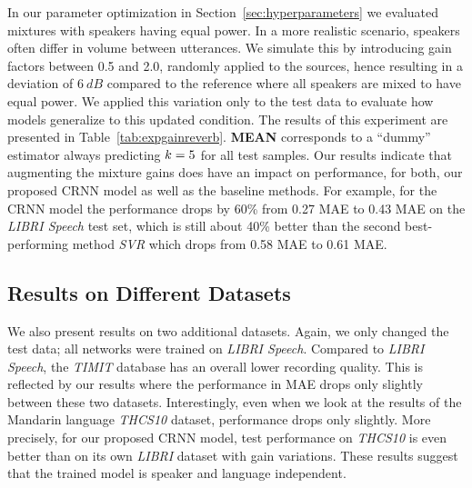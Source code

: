 In our parameter optimization in Section~\ref{sec:hyperparameters} we evaluated  mixtures with speakers having equal power.
In a more realistic scenario, speakers often differ in volume between utterances.
We simulate this by introducing gain factors between 0.5 and 2.0, randomly applied to the sources, hence resulting in a deviation of $6~dB$ compared to the reference where all speakers are mixed to have equal power.
We applied this variation only to the test data to evaluate how models generalize to this updated condition.
The results of this experiment are presented in Table~\ref{tab:expgainreverb}.
\textbf{MEAN} corresponds to a ``dummy'' estimator always predicting \(k = 5\) for all test samples.
Our results indicate that augmenting the mixture gains does have an impact on performance, for both, our proposed CRNN model as well as the baseline methods.
For example, for the CRNN model the performance drops by 60\% from 0.27 MAE to 0.43 MAE on the \emph{LIBRI Speech} test set, which is still about 40\% better than the second best-performing method \emph{SVR} which drops from 0.58 MAE to 0.61 MAE.\@

\subsection{Results on Different Datasets}%
\label{ssec:r_datasets}
We also present results on two additional datasets.
Again, we only changed the test data; all networks were trained on \emph{LIBRI Speech}.
Compared to \emph{LIBRI Speech}, the \emph{TIMIT} database has an overall lower recording quality.
This is reflected by our results where the performance in MAE drops only slightly between these two datasets.
Interestingly, even when we look at the results of the Mandarin language \emph{THCS10} dataset, performance drops only slightly.
More precisely, for our proposed CRNN model, test performance on \emph{THCS10} is even better than on its own \emph{LIBRI} dataset with gain variations.
These results suggest that the trained model is speaker and language independent.


